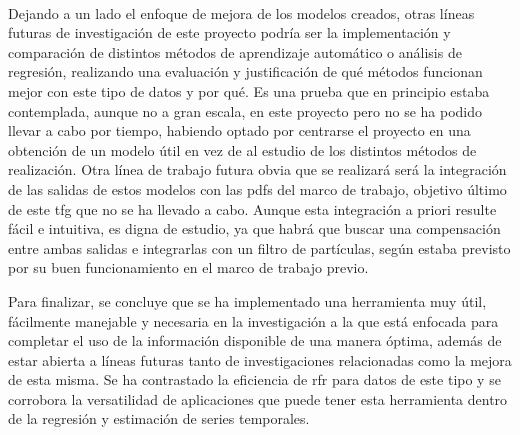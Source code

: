 \\
\par Dejando a un lado el enfoque de mejora de los modelos creados, otras líneas futuras de investigación de este proyecto podría ser la implementación y comparación de distintos métodos de aprendizaje automático o análisis de regresión, realizando una evaluación y justificación de qué métodos funcionan mejor con este tipo de datos y por qué. Es una prueba que en principio estaba contemplada, aunque no a gran escala, en este proyecto pero no se ha podido llevar a cabo por tiempo, habiendo optado por centrarse el proyecto en una obtención de un modelo útil en vez de al estudio de los distintos métodos de realización. Otra línea de trabajo futura obvia que se realizará será la integración de las salidas de estos modelos con las \gls{pdf}s del marco de trabajo, objetivo último de este \gls{tfg} que no se ha llevado a cabo. Aunque esta integración a priori resulte fácil e intuitiva, es digna de estudio, ya que habrá que buscar una compensación entre ambas salidas e integrarlas con un filtro de partículas, según estaba previsto por su buen funcionamiento en el marco de trabajo previo. 
\\
\par Para finalizar, se concluye que se ha implementado una herramienta muy útil, fácilmente manejable y necesaria en la investigación a la que está enfocada para completar el uso de la información disponible de una manera óptima, además de estar abierta a líneas futuras tanto de investigaciones relacionadas como la mejora de esta misma. Se ha contrastado la eficiencia de \gls{rfr} para datos de este tipo y se corrobora la versatilidad de aplicaciones que puede tener esta herramienta dentro de la regresión y estimación de series temporales. 